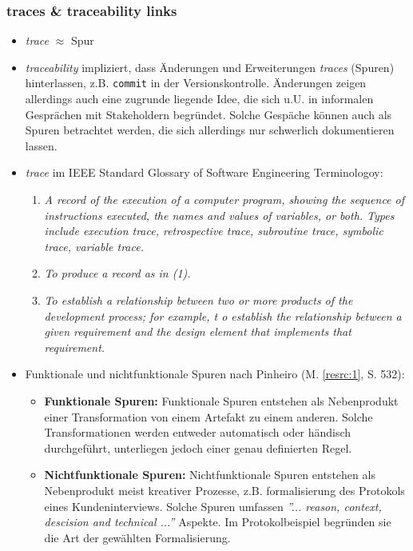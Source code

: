 
\subsubsection{traces \& traceability links}
\begin{itemize}

\item 
\textit{trace} $\approx$ Spur

\item
\textit{traceability} impliziert, dass Änderungen und Erweiterungen \textit{traces} (Spuren) hinterlassen, z.B. \texttt{commit} in der Versionskontrolle. Änderungen zeigen allerdings auch eine zugrunde liegende Idee, die sich u.U. in informalen Gesprächen mit Stakeholdern begründet. Solche Gespäche können auch als Spuren betrachtet werden, die sich allerdings nur schwerlich dokumentieren lassen.

\item
\textit{trace} im IEEE Standard Glossary of Software Engineering Terminologoy:
\begin{enumerate}
\item
\textit{A record of the execution of a computer program, showing the sequence of
instructions executed, the names and values
of variables, or both. Types include execution trace, retrospective trace, subroutine
trace, symbolic trace, variable trace.}
\item
\textit{To produce a record as in (1).}
\item
\textit{To establish a relationship between two or
more products of the development process;
for example, t o establish the relationship
between a given requirement and the design
element that implements that requirement.}
\end{enumerate}

\item
Funktionale und nichtfunktionale Spuren nach Pinheiro (M. \ref{resrc:1}, S. 532):
\begin{itemize}
\item 
\textbf{Funktionale Spuren:}
Funktionale Spuren entstehen als Nebenprodukt einer Transformation von einem Artefakt zu einem anderen. Solche Transformationen werden entweder automatisch oder händisch durchgeführt, unterliegen jedoch einer genau definierten Regel.
\item
\textbf{Nichtfunktionale Spuren:}
Nichtfunktionale Spuren entstehen als Nebenprodukt meist kreativer Prozesse, z.B. formalisierung des Protokols eines Kundeninterviews. Solche Spuren umfassen \textit{''... reason, context, descision and technical ...''} Aspekte. Im Protokolbeispiel begründen sie die Art der gewählten Formalisierung.
\end{itemize}


\end{itemize}
